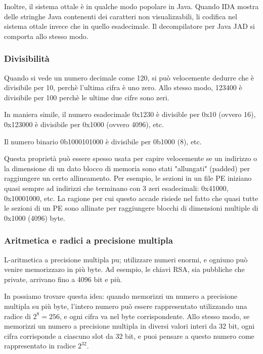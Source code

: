 Inoltre, il sistema ottale è in qualche modo popolare in Java. Quando IDA mostra delle stringhe Java contenenti dei caratteri non visualizzabili,
li codifica nel sistema ottale invece che in quello esadecimale.
Il decompilatore per Java JAD si comporta allo stesso modo.

\subsubsection{Divisibilità}

Quando si vede un numero decimale come 120, si può velocemente dedurre che è divisibile per 10, perchè l'ultima cifra è uno zero.
Allo stesso modo, 123400 è divisibile per 100 perchè le ultime due cifre sono zeri.

In maniera simile, il numero esadecimale 0x1230 è divisible per 0x10 (ovvero 16), 0x123000 è divisibile per 0x1000 (ovvero 4096), etc.

Il numero binario 0b1000101000 è divisibile per 0b1000 (8), etc.

Questa proprietà può essere spesso usata per capire velocemente se un indirizzo o la dimensione di un dato blocco di memoria sono stati "allungati" (padded) per raggiungere un certo allineamento.
Per esempio, le sezioni in un file \ac{PE} iniziano quasi sempre ad indirizzi che terminano con 3 zeri esadecimali: 0x41000, 0x10001000, etc.
La ragione per cui questo accade risiede nel fatto che quasi tutte le sezioni di un \ac{PE} sono allinate per raggiungere blocchi di dimensioni multiple di 0x1000 (4096) byte.

\subsubsection{Aritmetica e radici a precisione multipla}

L-aritmetica a precisione multipla pu; utilizzare numeri enormi, e ogniuno può venire memorizzazo in più byte.
Ad esempio, le chiavi RSA, sia pubbliche che private, arrivano fino a 4096 bit e più.

In  possiamo trovare questa idea: quando memorizzi un numero a precisione multipla su più byte,
l'intero numero può essere rappresentato utilizzando una radice di $2^8=256$, e ogni cifra va nel byte corrispondente.
Allo stesso modo, se memorizzi un numero a precisione multipla in diversi valori interi da 32 bit, ogni cifra corrisponde a ciascuno slot da 32 bit,
e puoi pensare a questo numero come rappresentato in radice $2^{32}$.

